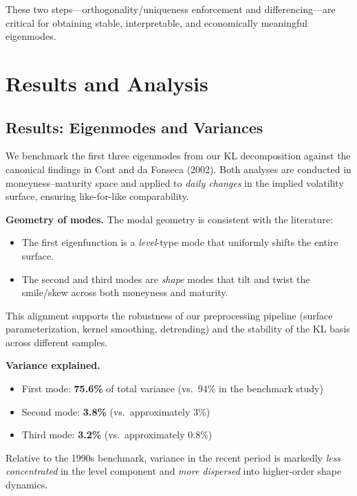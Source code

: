 \documentclass[a4paper,12pt]{report}
\begin{document}
These two steps—orthogonality/uniqueness enforcement and differencing—are critical for obtaining stable, interpretable, and economically meaningful eigenmodes.



\chapter{Results and Analysis}

\section{Results: Eigenmodes and Variances}
We benchmark the first three eigenmodes from our KL decomposition against the canonical findings in Cont and da Fonseca (2002). Both analyses are conducted in moneyness--maturity space and applied to \textit{daily changes} in the implied volatility surface, ensuring like-for-like comparability.

\textbf{Geometry of modes.}  
The modal geometry is consistent with the literature:  
\begin{itemize}
    \item The first eigenfunction is a \textit{level}-type mode that uniformly shifts the entire surface.
    \item The second and third modes are \textit{shape} modes that tilt and twist the smile/skew across both moneyness and maturity.
\end{itemize}
This alignment supports the robustness of our preprocessing pipeline (surface parameterization, kernel smoothing, detrending) and the stability of the KL basis across different samples.

\textbf{Variance explained.}  
\begin{itemize}
    \item First mode: \textbf{75.6\%} of total variance (vs.~94\% in the benchmark study)
    \item Second mode: \textbf{3.8\%} (vs.~approximately 3\%)
    \item Third mode: \textbf{3.2\%} (vs.~approximately 0.8\%)
\end{itemize}
Relative to the 1990s benchmark, variance in the recent period is markedly \textit{less concentrated} in the level component and \textit{more dispersed} into higher-order shape dynamics.
\end{document}
